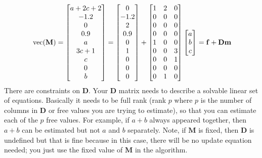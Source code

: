 \documentclass[]{article}
\def\DD{\mbox{$\mathbf D$}}	\def\dd{\mbox{$\mathbf d$}}
\def\MM{\mbox{$\mathbf M$}}  \def\mm{\mbox{$\mathbf m$}}
\def\vec{\,\textup{\textrm{vec}}}
\begin{document}
\begin{equation*}
\vec(\MM)=
\begin{bmatrix}
a+2c+2\\
-1.2\\
0\\
0.9\\
a\\
3c+1\\
c\\
0\\
b
\end{bmatrix}	
=
\begin{bmatrix}
0\\
-1.2\\
2\\
0.9\\
0\\
1\\
0\\
0\\
0
\end{bmatrix}
+
\begin{bmatrix}
1&2&0\\
0&0&0\\
0&0&0\\
0&0&0\\
1&0&0\\
0&0&3\\
0&0&1\\
0&0&0\\
0&1&0
\end{bmatrix}	
\begin{bmatrix}
a\\
b\\
c
\end{bmatrix}
= \ff + \DD\mm 
\end{equation*}
There are constraints on $\DD$.  Your $\DD$ matrix needs to describe a solvable linear set of equations.  Basically it needs to be full rank (rank $p$ where $p$ is the number of columns in $\DD$ or free values you are trying to estimate), so that you can estimate each of the $p$ free values.  For example, if $a+b$ always appeared together, then $a+b$ can be estimated but not $a$ and $b$ separately.  Note, if $\MM$ is fixed, then $\DD$ is undefined but that is fine because in this case, there will be no update equation needed; you just use the fixed value of $\MM$ in the algorithm.
\end{document}
